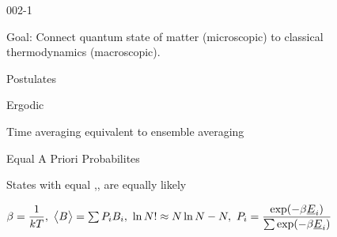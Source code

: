 \begin{mitframe}{002-1}

    
\begin{listone}
    
    \item Goal: Connect quantum state of matter (microscopic) to classical thermodynamics (macroscopic).
    
    \item Postulates
    
    \begin{listtwo}
    
    	\item Ergodic
        
        \begin{listthree}
        
    		\item Time averaging equivalent to ensemble averaging

		\end{listthree}

    	\item Equal A Priori Probabilites
        
       	\begin{listthree}
        
    		\item States with equal \nummoles,\uline{\vol},\uline{\energy} are equally likely
    
    	\end{listthree}
    
    \end{listtwo}
    
    \item $\boltznorm = \dfrac{1}{\thermcond\Temp},~\big\langle\exergy\big\rangle = \sum\nolimits\prob{i}\virialcoeff{i},~\ln\nummoles!\approx \nummoles\ln\nummoles - \nummoles,~\prob{i} = \dfrac{\exp(-\boltznorm\uline{\energy}_{\state})}{\sum\nolimits\exp(-\boltznorm\uline{\energy}_{\state})}$
\end{listone}
     
\end{mitframe}